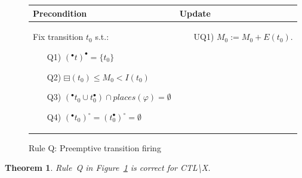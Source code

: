 \documentclass[11pt]{article}
\newtheorem{theorem}{Theorem}
\begin{document}
\begin{figure}[h!]
        \begin{adjustbox}{center}
            \begin{tabular}{|p{65mm}|p{45mm}|} \hline
            Precondition & Update \\ \hline
            Fix transition $t_0$ s.t.:
            \begin{itemize}[leftmargin=10mm]
                \item[Q1)] $({}^\bullet t)^\bullet = \{t_0\}$
                \item[Q2)] $\boxminus(t_0) \leq M_0 < I(t_0)$
                \item[Q3)] $({}^\bullet t_0 \cup t_0^\bullet) \cap
                places(\varphi) = \emptyset$
                \item[Q4)] $({}^\bullet t_0)^\circ = (t_0^\bullet)^\circ = \emptyset$
            \end{itemize}
            &
            \begin{itemize}[leftmargin=10mm]
                \item[UQ1)] $M_0:=M_0 + E(t_0)$.
            \end{itemize} \\ \hline
            \end{tabular}
        \end{adjustbox}
        \caption{Rule Q: Preemptive transition firing}
        \label{fig:rule_q}
    \end{figure}

    \begin{theorem}
        Rule~Q in Figure~\ref{fig:rule_q} is correct for CTL\textbackslash X.
    \end{theorem}
\end{document}
